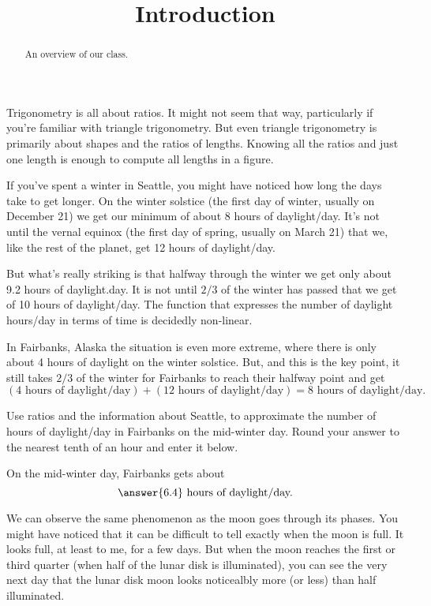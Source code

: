 \documentclass{ximera}
\title{Introduction}
\begin{document}
\begin{abstract}
An overview of our class.
\end{abstract}
\maketitle

Trigonometry is all about ratios. It might not seem that way, particularly if you're familiar with triangle trigonometry. But even triangle trigonometry is primarily about shapes and the ratios of lengths. Knowing all the ratios and just one length is enough to compute all lengths in a figure.

If you've spent a winter in Seattle, you might have noticed how long the days take to get longer. On the winter solstice (the first day of winter, usually on December 21) we get our minimum of about 8 hours of daylight/day. It's not until the vernal equinox
(the first day of spring, usually on March 21) that we, like the rest of the planet, get 12 hours of daylight/day.

But what's really striking is that halfway through the winter we get only about 9.2 hours of daylight.day. It is not until $2/3$ of the winter has passed that we get of 10 hours of daylight/day. The function that expresses the number of daylight hours/day in terms of time is decidedly non-linear.

In Fairbanks, Alaska the situation is even more extreme, where there is only about 4 hours of daylight on the winter solstice. But, and this is the key point, it still takes $2/3$ of the winter for Fairbanks to reach their halfway point and get
\[
  ( 4 \text{ hours of daylight/day}) + ( 12 \text{ hours of daylight/day}) =  8 \text{ hours of daylight/day}.
\]  

\begin{question} \label{Q1:Introduction}
Use ratios and the information about Seattle, to approximate the number of hours of daylight/day in Fairbanks on the mid-winter day. Round your answer to the nearest tenth of an hour and enter it below.

On the mid-winter day, Fairbanks gets about 
\[
    \answer{6.4} \text{ hours of daylight/day.}
\]
\end{question}

We can observe the same phenomenon as the moon goes through its phases. You might have noticed that it can be difficult to tell exactly when the moon is full. It looks full, at least to me, for a few days. But when the moon reaches the first or third quarter (when half of the lunar disk is illuminated), you can see the very next day that the lunar disk moon looks noticealbly more (or less) than half illuminated.
\end{document}
